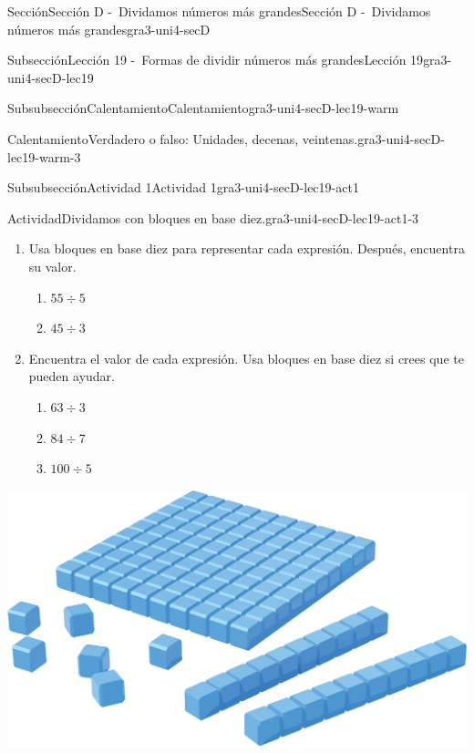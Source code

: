 \documentclass[twoside,10pt,]{article}
\begin{document}
\begin{sectionptx}{Sección}{Sección D -~Dividamos números más grandes}{}{Sección D -~Dividamos números más grandes}{}{}{gra3-uni4-secD}
\begin{subsectionptx}{Subsección}{Lección 19 -~Formas de dividir números más grandes}{}{Lección 19}{}{}{gra3-uni4-secD-lec19}
\begin{subsubsectionptx}{Subsubsección}{Calentamiento}{}{Calentamiento}{}{}{gra3-uni4-secD-lec19-warm}
\begin{exploration}{Calentamiento}{Verdadero o falso: Unidades, decenas, veintenas.}{gra3-uni4-secD-lec19-warm-3}
\begin{itemize}[label=\textbullet]
\end{itemize}
\end{exploration}%
\end{subsubsectionptx}
%
%
\typeout{************************************************}
\typeout{************************************************}
%
\begin{subsubsectionptx}{Subsubsección}{Actividad 1}{}{Actividad 1}{}{}{gra3-uni4-secD-lec19-act1}
\begin{activity}{Actividad}{Dividamos con bloques en base diez.}{gra3-uni4-secD-lec19-act1-3}%
\begin{sidebyside}{2}{0}{0}{0.1}%
\begin{sbspanel}{0.7}%
%
\begin{enumerate}
\item{}Usa bloques en base diez para representar cada expresión. Después, encuentra su valor.%
%
\begin{enumerate}
\item{}\(\displaystyle 55 \div 5\)%
\item{}\(\displaystyle 45 \div 3\)%
\end{enumerate}
\item{}Encuentra el valor de cada expresión. Usa bloques en base diez si crees que te pueden ayudar.%
%
\begin{enumerate}
\item{}\(\displaystyle 63 \div 3\)%
\item{}\(\displaystyle 84 \div 7\)%
\item{}\(\displaystyle 100 \div 5\)%
\end{enumerate}
\end{enumerate}
\end{sbspanel}%
\begin{sbspanel}{0.2}%
\includegraphics[width=\linewidth]{external/png-source/CS 3.4 Lesson 19 Activity 1.png}

\end{sbspanel}
\end{sidebyside}
\end{activity}
\end{subsubsectionptx}
\end{subsectionptx}
\end{sectionptx}
\end{document}
